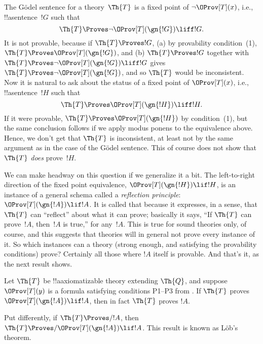 \documentclass[../../../include/open-logic-section]{subfiles}
\begin{document}


\newcommand{\pt}{\fn{Prov}_T}

The G\"odel sentence for a theory~$\Th{T}$ is a fixed point of $\lnot
\OProv[T](x)$, i.e., !!a{sentence}~$!G$ such that
\[
\Th{T} \Proves \lnot \OProv[T](\gn{!G}) \liff !G.
\]
It is not provable, because if $\Th{T} \Proves !G$, (a) by provability
condition~(1), $\Th{T} \Proves \OProv[T](\gn{!G})$, and (b) $\Th{T}
\Proves !G$ together with $\Th{T} \Proves \lnot \OProv[T](\gn{!G})
\liff !G$ gives $\Th{T} \Proves \lnot \OProv[T](\gn{!G})$, and so
$\Th{T}$ would be inconsistent.  Now it is natural to ask about the
status of a fixed point of $\OProv[T](x)$, i.e., !!a{sentence}~$!H$
such that
\[
\Th{T} \Proves \OProv[T](\gn{!H}) \liff !H.
\]
If it were provable, $\Th{T} \Proves \OProv[T](\gn{!H})$ by
condition~(1), but the same conclusion follows if we apply modus
ponens to the equivalence above. Hence, we don't get that $\Th{T}$ is
inconsistent, at least not by the same argument as in the case of the
G\"odel sentence. This of course does not show that $\Th{T}$
\emph{does} prove~$!H$.

We can make headway on this question if we generalize it a bit. The
left-to-right direction of the fixed point equivalence,
$\OProv[T](\gn{!H}) \lif !H$, is an instance of a general schema
called a \emph{reflection principle}: $\OProv[T](\gn{!A}) \lif !A$.
It is called that because it expresses, in a sense, that $\Th{T}$ can
``reflect'' about what it can prove; basically it says, ``If $\Th{T}$
can prove~$!A$, then~$!A$ is true,'' for any~$!A$.  This is true for
sound theories only, of course, and this suggests that theories will
in general not prove every instance of it.  So which instances can a
theory (strong enough, and satisfying the provability conditions)
prove?  Certainly all those where $!A$ itself is provable. And that's
it, as the next result shows.

\begin{thm}
Let $\Th{T}$ be !!a{axiomatizable} theory extending $\Th{Q}$, and
suppose $\OProv[T](y)$ is a formula satisfying conditions P1--P3 from
. If $\Th{T}$ proves $\OProv[T](\gn{!A}) \lif !A$,
then in fact $\Th{T}$ proves $!A$.
\end{thm}

Put differently, if $\Th{T} \Proves/ !A$, then $\Th{T} \Proves/
\OProv[T](\gn{!A}) \lif !A$. This result is known as L\"ob's
theorem.
\end{document}
